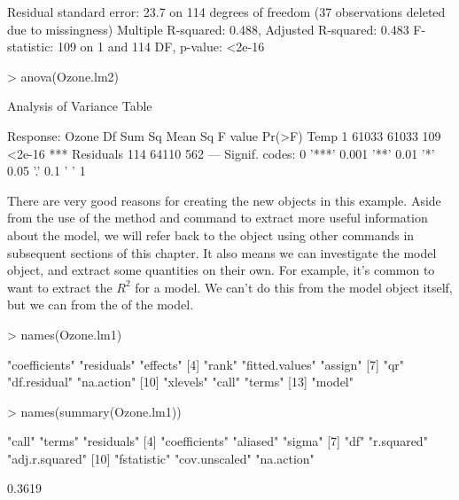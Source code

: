\begin{Schunk}
\begin{Soutput}
Residual standard error: 23.7 on 114 degrees of freedom
  (37 observations deleted due to missingness)
Multiple R-squared:  0.488,	Adjusted R-squared:  0.483 
F-statistic:  109 on 1 and 114 DF,  p-value: <2e-16
\end{Soutput}
\begin{Sinput}
> anova(Ozone.lm2) 
\end{Sinput}
\begin{Soutput}
Analysis of Variance Table

Response: Ozone
           Df Sum Sq Mean Sq F value Pr(>F)    
Temp        1  61033   61033     109 <2e-16 ***
Residuals 114  64110     562                   
---
Signif. codes:  
0 '***' 0.001 '**' 0.01 '*' 0.05 '.' 0.1 ' ' 1
\end{Soutput}
\end{Schunk}
There are very good reasons for creating the new objects in this example. Aside from the use of the  method and  command to extract more useful information about the model, we will refer back to the object using other commands in subsequent sections of this chapter. It also means we can investigate the model object, and extract some quantities on their own. For example, it's common to want to extract the $R^2$ for a model. We can't do this from the model object itself, but we can from the  of the model. 
\begin{Schunk}
\begin{Sinput}
> names(Ozone.lm1) 
\end{Sinput}
\begin{Soutput}
 [1] "coefficients"  "residuals"     "effects"      
 [4] "rank"          "fitted.values" "assign"       
 [7] "qr"            "df.residual"   "na.action"    
[10] "xlevels"       "call"          "terms"        
[13] "model"        
\end{Soutput}
\begin{Sinput}
> names(summary(Ozone.lm1)) 
\end{Sinput}
\begin{Soutput}
 [1] "call"          "terms"         "residuals"    
 [4] "coefficients"  "aliased"       "sigma"        
 [7] "df"            "r.squared"     "adj.r.squared"
[10] "fstatistic"    "cov.unscaled"  "na.action"    
\end{Soutput}
\begin{Soutput}
[1] 0.3619
\end{Soutput}
\end{Schunk}
 
